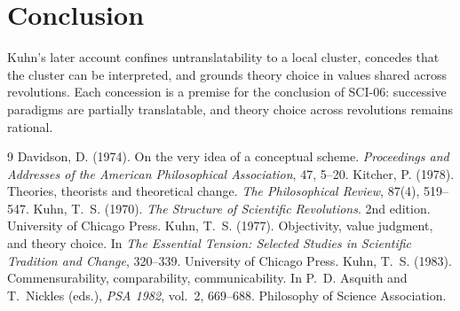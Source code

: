 \documentclass{situationist-preprint}
\begin{document}
\section{Conclusion}\label{s:conclusion}

Kuhn's later account confines untranslatability to a local cluster, concedes that the cluster can be interpreted, and grounds theory choice in values shared across revolutions. Each concession is a premise for the conclusion of SCI-06: successive paradigms are partially translatable, and theory choice across revolutions remains rational.

\begin{thebibliography}{9}
 Davidson, D. (1974). On the very idea of a conceptual scheme. \emph{Proceedings and Addresses of the American Philosophical Association}, 47, 5--20.
 Kitcher, P. (1978). Theories, theorists and theoretical change. \emph{The Philosophical Review}, 87(4), 519--547.
 Kuhn, T.~S. (1970). \emph{The Structure of Scientific Revolutions}. 2nd edition. University of Chicago Press.
 Kuhn, T.~S. (1977). Objectivity, value judgment, and theory choice. In \emph{The Essential Tension: Selected Studies in Scientific Tradition and Change}, 320--339. University of Chicago Press.
 Kuhn, T.~S. (1983). Commensurability, comparability, communicability. In P.~D. Asquith and T.~Nickles (eds.), \emph{PSA 1982}, vol.~2, 669--688. Philosophy of Science Association.
\end{thebibliography}
\end{document}
